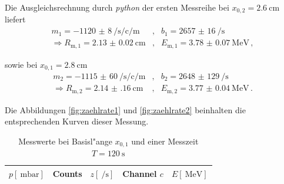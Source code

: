		\clearpage
		Die Ausgleichsrechnung durch \emph{python} der ersten Messreihe bei $x_{0,2} = \SI{2.6}{\centi \meter}$ liefert
		\begin{eqnarray*}
			m_1 = \SI{-1120(8)}{\per \second \per \centi \per \meter} &,& b_1 = \SI{2657(16)}{\per \second} \\
			\Rightarrow R_\mathrm{m,1} = \SI{2.13(2)}{\centi \meter} &,& E_\mathrm{m,1} = \SI{3.78(7)}{\mega \electronvolt} \,,
		\end{eqnarray*}

		sowie bei $x_{0,1} = \SI{2.8}{\centi \meter}$
		\begin{eqnarray*}
			m_2 = \SI{-1115(60)}{\per \second \per \centi \per \meter} &,& b_2 = \SI{2648(129)}{\per \second} \\
			\Rightarrow R_\mathrm{m,2} = \SI{2.14(16)}{\centi \meter} &,& E_\mathrm{m,2} = \SI{3.77(4)}{\mega \electronvolt} \,.
		\end{eqnarray*}

		Die Abbildungen \ref{fig:zaehlrate1} und \ref{fig:zaehlrate2} beinhalten die entsprechenden Kurven dieser Messung.

		\begin{table}[h!]
			\begin{center}
				\caption{Messwerte bei Basisl"ange $x_{0,1}$ und einer Messzeit $T = \SI{120}{\second}$ \label{table:messung1-1}}
				\begin{tabular}{|r|r|r|r|r|}
					\hline
						\multicolumn{1}{|c|}{$p [\SI{}{\milli \bar}]$}& 
						\multicolumn{1}{c|}{Counts} & 
						\multicolumn{1}{c|}{$z \left[\SI{}{\per \second}\right]$} & 
						\multicolumn{1}{c|}{Channel $c$} & 
						\multicolumn{1}{c|}{$E [\SI{}{\mega \electronvolt}]$} \\
					\hline 
					\hline
						
					\hline 
				\end{tabular}
			\end{center}
		\end{table}

